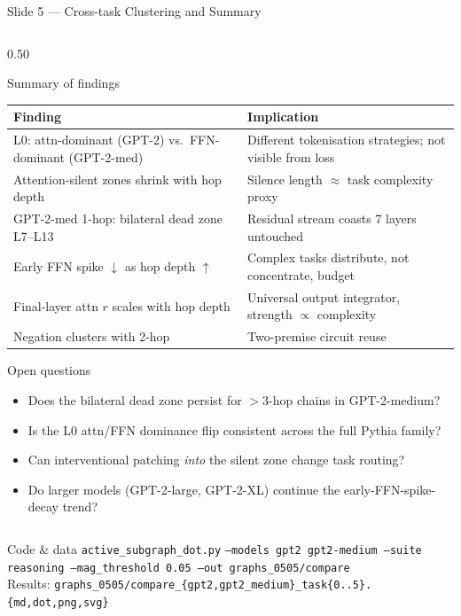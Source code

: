 \documentclass[aspectratio=169,10pt]{beamer}
\begin{document}
\begin{frame}{Slide 5 — Cross-task Clustering and Summary}
\begin{columns}[T]
\begin{column}{0.50\textwidth}
\begin{block}{Summary of findings}
\footnotesize
\renewcommand{\arraystretch}{1.25}
\begin{tabular}{p{3.2cm}p{4.0cm}}
\toprule
Finding & Implication \\
\midrule
L0: attn-dominant (GPT-2) vs.\ FFN-dominant (GPT-2-med) &
Different tokenisation strategies; not visible from loss \\
\midrule
Attention-silent zones shrink with hop depth &
Silence length $\approx$ task complexity proxy \\
\midrule
GPT-2-med 1-hop: bilateral dead zone L7–L13 &
Residual stream coasts 7 layers untouched \\
\midrule
Early FFN spike $\downarrow$ as hop depth $\uparrow$ &
Complex tasks distribute, not concentrate, budget \\
\midrule
Final-layer attn $r$ scales with hop depth &
Universal output integrator, strength $\propto$ complexity \\
\midrule
Negation clusters with 2-hop & Two-premise circuit reuse \\
\bottomrule
\end{tabular}
\end{block}

\vspace{4pt}
\begin{block}{Open questions}
\footnotesize
\begin{itemize}
  \item Does the bilateral dead zone persist for $>$3-hop chains in GPT-2-medium?
  \item Is the L0 attn/FFN dominance flip consistent across the full Pythia family?
  \item Can interventional patching \emph{into} the silent zone change task routing?
  \item Do larger models (GPT-2-large, GPT-2-XL) continue the early-FFN-spike-decay trend?
\end{itemize}
\end{block}
\end{column}

\end{columns}

\vspace{4pt}
\begin{block}{\footnotesize Code \& data}
\footnotesize
\texttt{active\_subgraph\_dot.py} \quad
\texttt{--models gpt2 gpt2-medium --suite reasoning --mag\_threshold 0.05 --out graphs\_0505/compare}\\
Results: \texttt{graphs\_0505/compare\_\{gpt2,gpt2\_medium\}\_task\{0..5\}.\{md,dot,png,svg\}}
\end{block}

\end{frame}
\end{document}

